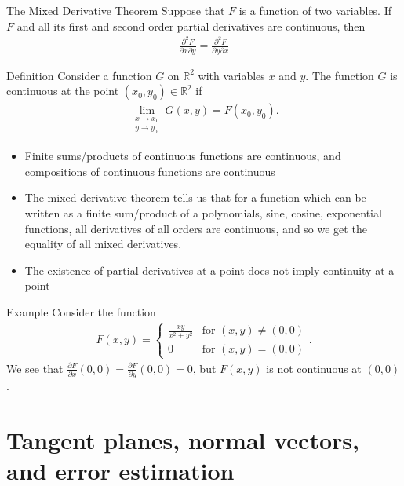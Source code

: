 \documentclass{report}
\begin{document}
			\begin{question}{The Mixed Derivative Theorem}
				Suppose that $F$ is a function of two variables. If $F$ and all its first and second order partial derivatives are continuous, then
					\begin{align*}
						\frac{\partial^2 F}{\partial x \partial y} = \frac{\partial^2 F}{\partial y \partial x}
					\end{align*}
			\end{question}

			\begin{question}{Definition}
				Consider a function $G$ on $\mathbb{R}^2$ with variables $x$ and $y$. The function $G$ is continuous at the point $(x_0,y_0) \in \mathbb{R}^2$ if
					\begin{align*}
						\lim_{\substack{x \to x_0 \\ y \to y_0}} G (x,y) = F(x_0,y_0).
					\end{align*}
			\end{question}

			\begin{itemize}
				\item Finite sums/products of continuous functions are continuous, and compositions of continuous functions are continuous
				\item The mixed derivative theorem tells us that for a function which can be written as a finite sum/product of a polynomials, sine, cosine, exponential functions, all derivatives of all orders are continuous, and so we get the equality of all mixed derivatives.
				\item The existence of partial derivatives at a point does not imply continuity at a point
			\end{itemize}

			\begin{question}{Example}
				Consider the function
					\begin{align*}
						F(x,y) = \begin{cases} \frac{xy}{x^2 + y^2} &\text{for }(x,y)\neq (0,0) \\ 0 &\text{for } (x,y) = (0,0)\end{cases}.
					\end{align*}
				We see that $\frac{\partial F}{\partial x} (0,0) = \frac{\partial F}{\partial y} (0,0) = 0$, but $F(x,y)$ is not continuous at $(0,0)$.
			\end{question}

\chapter{Tangent planes, normal vectors, and error estimation}
\end{document}
